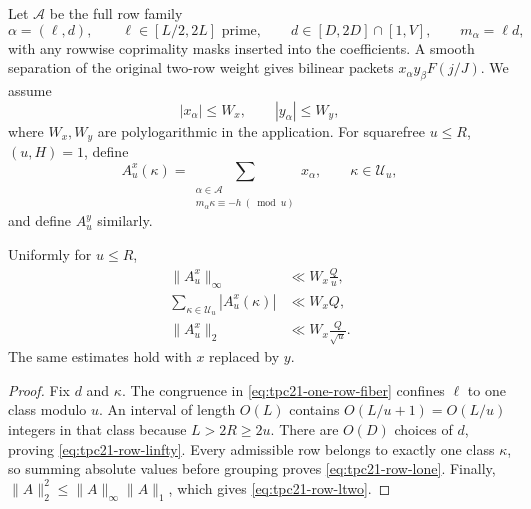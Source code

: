 Let \(\mathscr A\) be the full row family
\begin{equation}
 \alpha=(\ell,d),\qquad
 \ell\in[L/2,2L]\text{ prime},\qquad
 d\in[D,2D]\cap[1,V],\qquad m_\alpha=\ell d,
 \label{eq:tpc21-row-family}
\end{equation}
with any rowwise coprimality masks inserted into the coefficients.  A
smooth separation of the original two-row weight gives bilinear packets
\(x_\alpha y_\beta F(j/J)\).  We assume
\begin{equation}
 |x_\alpha|\le W_x,\qquad |y_\alpha|\le W_y,
 \label{eq:tpc21-row-weight-size}
\end{equation}
where \(W_x,W_y\) are polylogarithmic in the application.  For
squarefree \(u\le R\), \((u,H)=1\), define
\begin{equation}
 A_u^x(\kappa)
 =\sum_{\substack{\alpha\in\mathscr A\\
 m_\alpha\kappa\equiv-h\ (\bmod u)}}x_\alpha,
 \qquad \kappa\in\mathcal U_u,
 \label{eq:tpc21-one-row-fiber}
\end{equation}
and define \(A_u^y\) similarly.

\begin{lemma}
\label{lem:tpc21-row-occupancy}
Uniformly for \(u\le R\),
\begin{align}
 \|A_u^x\|_\infty
 &\ll W_x\frac Qu,
 \label{eq:tpc21-row-linfty}\\
 \sum_{\kappa\in\mathcal U_u}|A_u^x(\kappa)|
 &\ll W_xQ,
 \label{eq:tpc21-row-lone}\\
 \|A_u^x\|_2
 &\ll W_x\frac Q{\sqrt u}.
 \label{eq:tpc21-row-ltwo}
\end{align}
The same estimates hold with \(x\) replaced by \(y\).
\end{lemma}

\begin{proof}
Fix \(d\) and \(\kappa\).  The congruence in
\eqref{eq:tpc21-one-row-fiber} confines \(\ell\) to one class modulo
\(u\).  An interval of length \(O(L)\) contains
\(O(L/u+1)=O(L/u)\) integers in that class because \(L>2R\ge2u\).
There are \(O(D)\) choices of \(d\), proving
\eqref{eq:tpc21-row-linfty}.  Every admissible row belongs to exactly
one class \(\kappa\), so summing absolute values before grouping proves
\eqref{eq:tpc21-row-lone}.  Finally,
\(\|A\|_2^2\le\|A\|_\infty\|A\|_1\), which gives
\eqref{eq:tpc21-row-ltwo}.
\end{proof}

